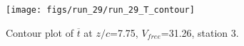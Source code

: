 \begin{figure}[H]
\centering
\texttt{[image: figs/run\_29/run\_29\_T\_contour]}
\caption{Contour plot of $\overline{t}$ at $z/c$=7.75, $V_{free}$=31.26, station 3.}
\label{fig:run_29_T_contour}
\end{figure}


